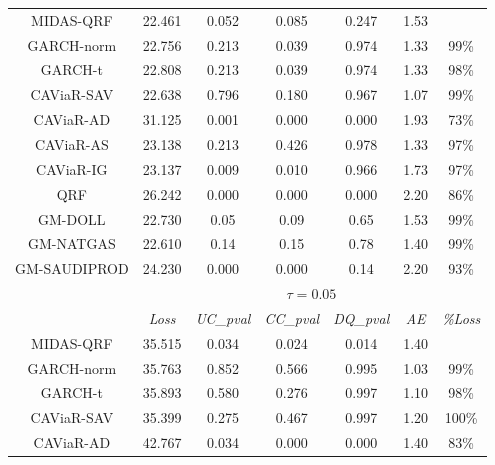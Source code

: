 \begin{table}[H]
\begin{tabular}{ccccccc}
\rowcolor[HTML]{D9D9D9} MIDAS-QRF  & 22.461 & 0.052    & 0.085    & 0.247    & 1.53 &        \\
\rowcolor[HTML]{D9D9D9}GARCH-norm                                              & 22.756 & 0.213    & 0.039    & 0.974    & 1.33 & 99\%   \\
\rowcolor[HTML]{D9D9D9}GARCH-t                                                 & 22.808 & 0.213    & 0.039    & 0.974    & 1.33 & 98\%   \\
\rowcolor[HTML]{D9D9D9} CAViaR-SAV & 22.638 & 0.796    & 0.180    & 0.967    & 1.07 & 99\%   \\
CAViaR-AD                                               & 31.125 & 0.001    & 0.000    & 0.000    & 1.93 & 73\%   \\
\rowcolor[HTML]{D9D9D9} CAViaR-AS  & 23.138 & 0.213    & 0.426    & 0.978    & 1.33 & 97\%   \\
 CAViaR-IG  & 23.137 & 0.009    & 0.010    & 0.966    & 1.73 & 97\%   \\
QRF                                                     & 26.242 & 0.000    & 0.000    & 0.000    & 2.20 & 86\%   \\
\rowcolor[HTML]{D9D9D9} GM-DOLL    & 22.730 & 0.05     & 0.09     & 0.65     & 1.53 & 99\%   \\
\rowcolor[HTML]{D9D9D9} GM-NATGAS  & 22.610 & 0.14     & 0.15     & 0.78     & 1.40 & 99\%   \\
GM-SAUDIPROD                                            & 24.230 & 0.000    & 0.000    & 0.14     & 2.20 & 93\%   \\ \hline
                                                        & \multicolumn{6}{c}{$\tau=0.05$}                         \\ \hline
                                                        & \textit{Loss}   & \textit{UC\_pval} & \textit{CC\_pval} & \textit{DQ\_pval }& \textit{AE }  & \textit{\%Loss}\\ \hline
\rowcolor[HTML]{D9D9D9} MIDAS-QRF  & 35.515 & 0.034    & 0.024    & 0.014    & 1.40 &        \\
\rowcolor[HTML]{D9D9D9} GARCH-norm & 35.763 & 0.852    & 0.566    & 0.995    & 1.03 & 99\%   \\
\rowcolor[HTML]{D9D9D9} GARCH-t    & 35.893 & 0.580    & 0.276    & 0.997    & 1.10 & 98\%   \\
\rowcolor[HTML]{D9D9D9} CAViaR-SAV & 35.399 & 0.275    & 0.467    & 0.997    & 1.20 & 100\%  \\
CAViaR-AD                                               & 42.767 & 0.034    & 0.000    & 0.000    & 1.40 & 83\%   \\

\end{tabular}
\end{table}
